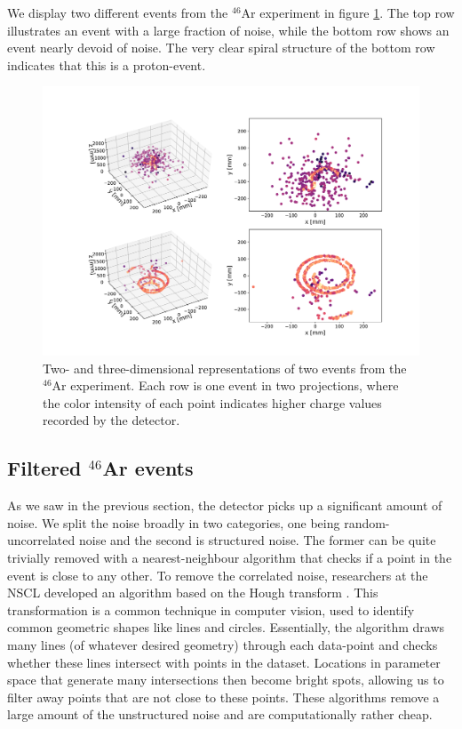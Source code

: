 \documentclass[preprint,12pt]{elsarticle}
\begin{document}
We display two different events from the ${}^{46}$Ar experiment in figure \ref{fig:samples}. The top row illustrates an event with a large fraction of noise, while the bottom row shows an event nearly devoid of noise. The very clear spiral structure of the bottom row indicates that this is a proton-event.

\begin{figure}[ht]
\centering
\includegraphics[width=\textwidth]{plots/display_eventsfull_.pdf}
\caption[Displaying un-filtered events in 2D and 3D]{Two- and three-dimensional representations of two events from the ${}^{46}$Ar experiment. Each row is one event in two projections, where the color intensity of each point indicates higher charge values recorded by the detector.}\label{fig:samples}
\end{figure}

\subsection{Filtered \texorpdfstring{${}^{46}$Ar}{46Ar} events}\label{sec:filtered}

As we saw in the previous section, the detector picks up a significant amount of noise. We split the noise broadly in two categories,  one being random-uncorrelated noise and the second is structured noise. The former can be quite trivially removed with a nearest-neighbour algorithm that checks if a point in the event is close to any other. To remove the correlated noise, researchers at the NSCL developed an algorithm based on the Hough transform \cite{Newman1972}. This transformation is a common technique in computer vision, used to identify common geometric shapes like lines and circles. Essentially, the algorithm draws many lines (of whatever desired geometry) through each data-point and checks whether these lines intersect with points in the dataset. Locations in parameter space that generate many intersections then become bright spots, allowing us to filter away points that are not close to these points. These algorithms remove a large amount of the unstructured noise and are computationally rather cheap.
\end{document}
